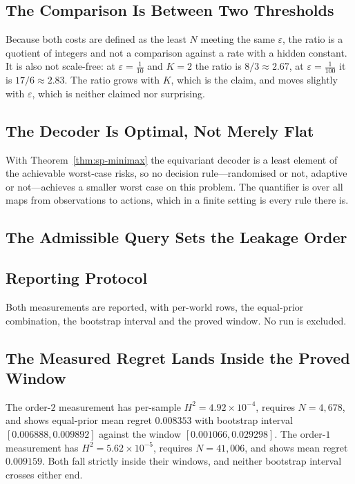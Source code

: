 \documentclass[conference]{IEEEtran}
\theoremstyle{definition}
\begin{document}
\subsection{The Comparison Is Between Two Thresholds}

Because both costs are defined as the least $N$ meeting the same $\varepsilon$, the ratio is a
quotient of integers and not a comparison against a rate with a hidden constant. It is also
not scale-free: at $\varepsilon=\tfrac{1}{10}$ and $K=2$ the ratio is $8/3\approx2.67$, at
$\varepsilon=\tfrac{1}{100}$ it is $17/6\approx2.83$. The ratio grows with $K$, which is the
claim, and moves slightly with $\varepsilon$, which is neither claimed nor surprising.

\subsection{The Decoder Is Optimal, Not Merely Flat}

With Theorem~\ref{thm:sp-minimax} the equivariant decoder is a least element of the achievable
worst-case risks, so no decision rule---randomised or not, adaptive or not---achieves a
smaller worst case on this problem. The quantifier is over all maps from observations to
actions, which in a finite setting is every rule there is.


\subsection{The Admissible Query Sets the Leakage Order}
\label{sec:qy-results}

\subsection{Reporting Protocol}

Both measurements are reported, with per-world rows, the equal-prior combination, the
bootstrap interval and the proved window. No run is excluded.

\subsection{The Measured Regret Lands Inside the Proved Window}

The order-$2$ measurement has per-sample $H^{2}=4.92\times10^{-4}$, requires $N=4{,}678$,
and shows equal-prior mean regret $0.008353$ with bootstrap interval
$[0.006888,0.009892]$ against the window $[0.001066,0.029298]$. The order-$1$ measurement
has $H^{2}=5.62\times10^{-5}$, requires $N=41{,}006$, and shows mean regret $0.009159$. Both
fall strictly inside their windows, and neither bootstrap interval crosses either end.
\end{document}
